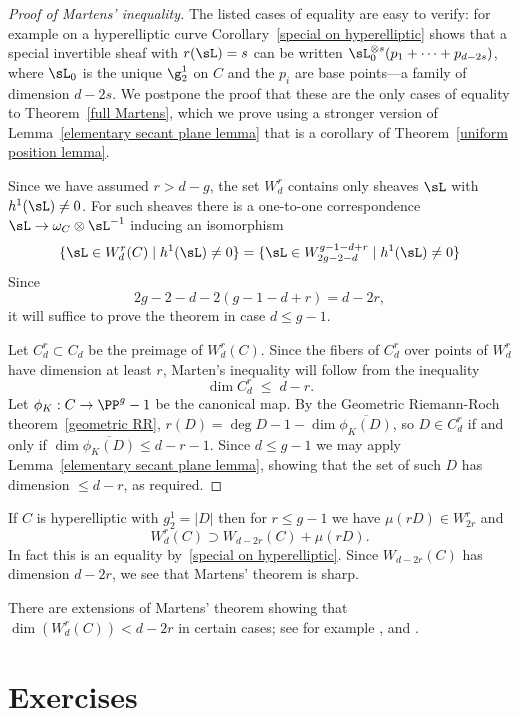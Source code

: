\begin{proof}[Proof of Martens' inequality] 
 The listed cases of equality are easy to verify: for example on a hyperelliptic curve Corollary~\ref{special on hyperelliptic} shows that a special invertible sheaf with  $r(\sL) = s$ can be written $\sL_0^{\otimes s}(p_1+\cdots + p_{d-2s})$, where
$\sL_0$ is the unique $\g^1_2$ on $C$ and the $p_i$ are base points---a family of dimension $d-2s$.
We postpone the proof that these are the only cases of equality to Theorem~\ref{full Martens}, which we prove
using a stronger version of Lemma~\ref{elementary secant plane lemma} that is a corollary of Theorem~\ref{uniform position lemma}. 

Since we have assumed $r>d-g$, the set $W^r_d$ contains only  sheaves
 $\sL$ with $h^1(\sL)\neq 0$. For such sheaves there is a one-to-one 
correspondence $\sL \to \omega_C\otimes \sL^{-1}$ inducing an isomorphism
$$
\{\sL \in W^r_d(C) \mid h^1(\sL) \neq 0 \}= \{\sL \in W^{g-1-d+r}_{2g-2-d} \mid h^1(\sL) \neq 0 \}%
$$
Since
$$
2g-2-d - 2(g-1-d+r) = d-2r,
$$
it will suffice to prove the theorem in case $d \leq g-1$.

Let $C^r_d\subset C_d$ be the preimage of $W^r_d(C)$. Since the fibers of $C^r_d$ over points of
$W^r_d$ have dimension at least $r$, Marten's inequality will follow from the inequality
$$
\dim C^r_d \; \leq \; d-r.
$$
Let $\phi_K: C\to \PP^g-1$ be the canonical map. By the Geometric Riemann-Roch theorem~\ref{geometric RR}, $r(D) = \deg D -1 -\dim\overline{\phi_K(D)}$, 
so $D\in C^r_d$ if and only if
$\dim \overline{\phi_K(D)}\leq d-r-1$. Since $d\leq g-1$ we may apply  Lemma~\ref{elementary secant plane lemma}, showing that the set of such $D$ has dimension $\leq d-r$, as required.
\end{proof}


If $C$ is hyperelliptic with $g^1_2 = |D|$ then for $r\leq g-1$ we have $\mu(rD) \in W^r_{2r}$ and
$$
W^r_d(C) \supset W_{d-2r}(C) + \mu(rD).
$$
In fact this is an equality by~\ref{special on hyperelliptic}. Since $W_{d-2r}(C)$ has dimension $d-2r$, we see that Martens' theorem is sharp. 

There are extensions of Martens' theorem showing that $\dim(W^r_d(C)) < d-2r$ in certain cases; see for example \cite{Mumford-Prym1} \cite{Keem},
and \cite{Coppens}.

\section{Exercises}

